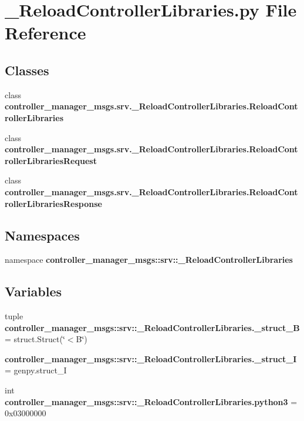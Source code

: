 \section{\-\_\-\-Reload\-Controller\-Libraries.\-py \-File \-Reference}
\label{__ReloadControllerLibraries_8py}
\subsection*{\-Classes}
\begin{DoxyCompactItemize}
\item 
class {\bf controller\-\_\-manager\-\_\-msgs.\-srv.\-\_\-\-Reload\-Controller\-Libraries.\-Reload\-Controller\-Libraries}
\item 
class {\bf controller\-\_\-manager\-\_\-msgs.\-srv.\-\_\-\-Reload\-Controller\-Libraries.\-Reload\-Controller\-Libraries\-Request}
\item 
class {\bf controller\-\_\-manager\-\_\-msgs.\-srv.\-\_\-\-Reload\-Controller\-Libraries.\-Reload\-Controller\-Libraries\-Response}
\end{DoxyCompactItemize}
\subsection*{\-Namespaces}
\begin{DoxyCompactItemize}
\item 
namespace {\bf controller\-\_\-manager\-\_\-msgs\-::srv\-::\-\_\-\-Reload\-Controller\-Libraries}
\end{DoxyCompactItemize}
\subsection*{\-Variables}
\begin{DoxyCompactItemize}
\item 
tuple {\bf controller\-\_\-manager\-\_\-msgs\-::srv\-::\-\_\-\-Reload\-Controller\-Libraries.\-\_\-struct\-\_\-\-B} = struct.\-Struct(\char`\"{}$<$\-B\char`\"{})
\item 
{\bf controller\-\_\-manager\-\_\-msgs\-::srv\-::\-\_\-\-Reload\-Controller\-Libraries.\-\_\-struct\-\_\-\-I} = genpy.\-struct\-\_\-\-I
\item 
int {\bf controller\-\_\-manager\-\_\-msgs\-::srv\-::\-\_\-\-Reload\-Controller\-Libraries.\-python3} = 0x03000000
\end{DoxyCompactItemize}
